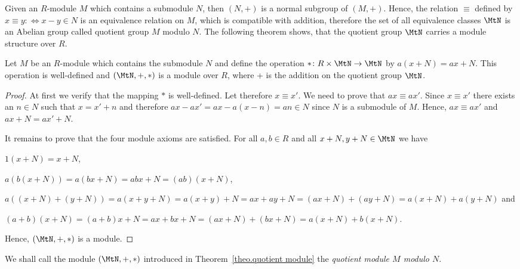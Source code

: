 Given an $R$-module $M$ which contains a submodule $N$, then $(N,+)$ is a normal subgroup of $(M,+)$. Hence, the relation $\equiv$ defined by $x\equiv y:\Leftrightarrow x-y\in N$ is an equivalence relation on $M$, which is compatible with addition, therefore the set of all equivalence classes $\MtN$ is an Abelian group called quotient group $M$ modulo $N$. The following theorem shows, that the quotient group $\MtN$ carries a module structure over $R$.

\begin{theo} \label{theo.quotient module}
Let $M$ be an $R$-module which contains the submodule $N$ and define the operation $\ast\colon R\times \MtN\rightarrow \MtN$ by $a(x+N)=ax+N$. This operation is well-defined and $(\MtN,+,\ast)$ is a module over $R$, where + is the addition on the quotient group $\MtN$.
\end{theo}

\begin{proof}
At first we verify that the mapping $\ast$ is well-defined. Let therefore $x\equiv x'$. We need to prove that $ax\equiv ax'$. Since $x\equiv x'$ there exists an $n\in N$ such that $x=x'+n$ and therefore $ax-ax'=ax-a(x-n)=an\in N$ since $N$ is a submodule of $M$. Hence, $ax\equiv ax'$ and $ax+N=ax'+N$. 

It remains to prove that the four module axioms are satisfied. For all $a,b\in R$ and all $x+N,y+N\in \MtN$ we have
\begin{compactenum}
\item $1(x+N)=x+N$,
\item $a(b(x+N))=a(bx+N)=abx+N=(ab)(x+N)$,
\item $a((x+N)+(y+N))=a(x+y+N)=a(x+y)+N=ax+ay+N=(ax+N)+(ay+N)=a(x+N)+a(y+N)$ and
\item $(a+b)(x+N)=(a+b)x+N=ax+bx+N=(ax+N)+(bx+N)=a(x+N)+b(x+N)$.
\end{compactenum}
Hence, $(\MtN,+,\ast)$ is a module.
\end{proof}

\begin{defin}
We shall call the module $(\MtN,+,\ast)$ introduced in Theorem~\ref{theo.quotient module} the \emph{quotient module $M$ modulo $N$}.
\end{defin}


